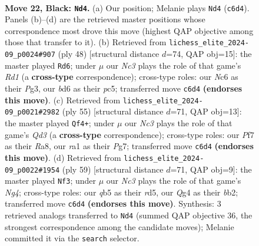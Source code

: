\documentclass[11pt]{article}
\begin{document}
\clearpage

\begin{figure}[p]\centering
\begin{subfigure}{0.46\textwidth}\centering
\resizebox{\linewidth}{!}{%
\newchessgame
\chessboard[
  setfen={r5k1/p4p1p/2nB2p1/1Q6/4r1q1/P7/5P1P/R6K b - - 0 22},
  showmover=false,
  pgfstyle=straightmove, color=movearrow, markmove={c6-d4}
]}
\caption{}
\end{subfigure}\hfill
\begin{subfigure}{0.46\textwidth}\centering
\resizebox{\linewidth}{!}{%
\newchessgame
\chessboard[
  setfen={r5k1/p4p1p/6p1/2p1Q3/6q1/6P1/PP3P2/1K1R4 w - - 1 25},
  showmover=false,
  pgfstyle=straightmove, color=movearrow, markmove={d1-d6}
]}
\caption{}
\end{subfigure}
\\[4pt]
\begin{subfigure}{0.46\textwidth}\centering
\resizebox{\linewidth}{!}{%
\newchessgame
\chessboard[
  setfen={r6k/1p4p1/p2q4/2p4p/8/1B3P1P/P1P2P2/2KR4 b - - 0 28},
  showmover=false,
  pgfstyle=straightmove, color=movearrow, markmove={d6-f4}
]}
\caption{}
\end{subfigure}\hfill
\begin{subfigure}{0.46\textwidth}\centering
\resizebox{\linewidth}{!}{%
\newchessgame
\chessboard[
  setfen={1r2r1k1/6pp/5p2/3R2n1/8/Pp4P1/1B3P1P/2R2K2 b - - 0 30},
  showmover=false,
  pgfstyle=straightmove, color=movearrow, markmove={g5-f3}
]}
\caption{}
\end{subfigure}
\caption{\textbf{Move 22, Black: \texttt{Nd4}.} (a) Our position; Melanie plays \texttt{Nd4} (\texttt{c6d4}). Panels (b)--(d) are the retrieved master positions whose correspondence most drove this move (highest QAP objective among those that transfer to it). (b) Retrieved from \texttt{lichess\_elite\_2024-09\_p0024\#907} (ply 48) [structural distance $d$=74, QAP obj=15]: the master played \texttt{Rd6}; under $\mu$ our \emph{Nc3} plays the role of that game's \emph{Rd1} (a \textbf{cross-type} correspondence); cross-type roles: our \emph{N}c6 as their \emph{P}g3, our \emph{b}d6 as their \emph{p}c5; transferred move \texttt{c6d4} \textbf{(endorses this move)}. (c) Retrieved from \texttt{lichess\_elite\_2024-09\_p0021\#2982} (ply 55) [structural distance $d$=71, QAP obj=13]: the master played \texttt{Qf4+}; under $\mu$ our \emph{Nc3} plays the role of that game's \emph{Qd3} (a \textbf{cross-type} correspondence); cross-type roles: our \emph{P}f7 as their \emph{R}a8, our \emph{r}a1 as their \emph{P}g7; transferred move \texttt{c6d4} \textbf{(endorses this move)}. (d) Retrieved from \texttt{lichess\_elite\_2024-09\_p0022\#1954} (ply 59) [structural distance $d$=71, QAP obj=9]: the master played \texttt{Nf3}; under $\mu$ our \emph{Nc3} plays the role of that game's \emph{Ng4}; cross-type roles: our \emph{q}b5 as their \emph{r}d5, our \emph{Q}g4 as their \emph{b}b2; transferred move \texttt{c6d4} \textbf{(endorses this move)}. Synthesis: 3 retrieved analogs transferred to \texttt{Nd4} (summed QAP objective 36, the strongest correspondence among the candidate moves); Melanie committed it via the \texttt{search} selector.}
\label{fig:thought-m43}
\end{figure}
\end{document}
